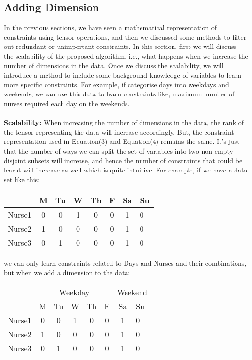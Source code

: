 \documentclass{article}
\begin{document}
\subsection{Adding Dimension}
In the previous sections, we have seen a mathematical representation of constraints using tensor operations, and then we discussed some methods to filter out redundant or unimportant constraints. In this section, first we will discuss the scalability of the proposed algorithm, i.e., what happens when we increase the number of dimensions in the data. Once we discuss the scalability, we will introduce a method to include some background knowledge of variables to learn more specific constraints. For example, if categorise days into weekdays and weekends, we can use this data to learn constraints like, maximum number of nurses required each day on the weekends.\\
\\
\textbf{Scalability: } When increasing the number of dimensions in the data, the rank of the tensor representing the data will increase accordingly. But, the constraint representation used in Equation(3) and Equation(4) remains the same. It's just that the number of ways we can split the set of variables into two non-empty disjoint subsets will increase, and hence the number of constraints that could be learnt will increase as well which is quite intuitive. For example, if we have a data set like this:
\begin{center}
\begin{tabular}{c|c|c|c|c|c|c|l|}
\cline{2-8}
\multicolumn{1}{l|}{}        & M & Tu & W & Th & F & Sa & Su \\ \hline
\multicolumn{1}{|c|}{Nurse1} & 0   & 0   & 1 & 0   & 0   & 1 & 0 \\ \hline
\multicolumn{1}{|c|}{Nurse2} & 1   & 0   & 0  & 0   & 0   & 1 & 0 \\ \hline
\multicolumn{1}{|c|}{Nurse3} & 0   & 1   & 0 & 0   & 0   & 1 & 0 \\ \hline
\end{tabular}
\end{center}
we can only learn constraints related to Days and Nurses and their combinations, but when we add a dimension to the data:
\begin{center}
\begin{tabular}{c|c|c|c|c|c|c|l|}
\cline{2-8}
& \multicolumn{5}{c|}{Weekday} & \multicolumn{2}{c|}{Weekend} \\ \cline{2-8} 
\multicolumn{1}{l|}{}        & M & Tu & W & Th & F & Sa & Su \\ \hline
\multicolumn{1}{|c|}{Nurse1} & 0   & 0   & 1 & 0   & 0   & 1 & 0 \\ \hline
\multicolumn{1}{|c|}{Nurse2} & 1   & 0   & 0  & 0   & 0   & 1 & 0 \\ \hline
\multicolumn{1}{|c|}{Nurse3} & 0   & 1   & 0 & 0   & 0   & 1 & 0 \\ \hline
\end{tabular}
\end{center}
\end{document}

